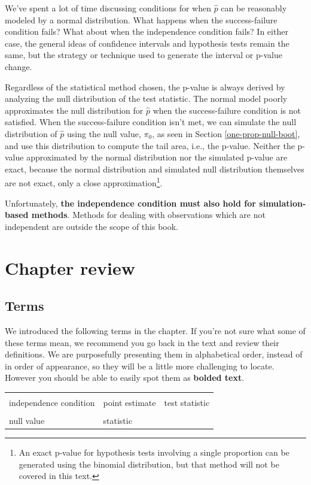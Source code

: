 \documentclass[
  10pt,
  openany]{book}
\theoremstyle{definition}
\theoremstyle{definition}
\theoremstyle{definition}
\theoremstyle{definition}
\theoremstyle{remark}
\begin{document}
We've spent a lot of time discussing conditions for when \(\hat{p}\) can be reasonably modeled by a normal distribution. What happens when the success-failure condition fails? What about when the independence condition fails? In either case, the general ideas of confidence intervals and hypothesis tests remain the same, but the strategy or technique used to generate the interval or p-value change.

Regardless of the statistical method chosen, the p-value is always derived by analyzing the null distribution of the test statistic. The normal model poorly approximates the null distribution for \(\hat{p}\) when the success-failure condition is not satisfied. When the success-failure condition isn't met, we can simulate the null distribution of \(\hat{p}\) using the null value, \(\pi_0\), as seen in Section \ref{one-prop-null-boot}, and use this distribution to compute the tail area, i.e., the p-value. Neither the p-value approximated by the normal distribution nor the simulated p-value are exact, because the normal distribution and simulated null distribution themselves are not exact, only a close approximation\footnote{An exact p-value for hypothesis tests involving a single proportion can be generated using the binomial distribution, but that method will not be covered in this text.}.

Unfortunately, \textbf{the independence condition must also hold for simulation-based methods}. Methods for dealing with observations which are not independent are outside the scope of this book.

\section{Chapter review}\label{chp14-review}

\subsection*{Terms}\label{terms-11}

We introduced the following terms in the chapter. If you're not sure what some of these terms mean, we recommend you go back in the text and review their definitions. We are purposefully presenting them in alphabetical order, instead of in order of appearance, so they will be a little more challenging to locate. However you should be able to easily spot them as \textbf{bolded text}.

\begin{tabu} to 
\toprule
{} &  & \\
independence condition & point estimate & test statistic\\
 &  & \\
null value & statistic & \\
\bottomrule
\end{tabu}
\end{document}
